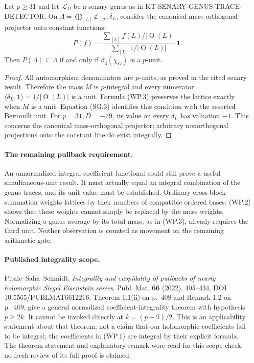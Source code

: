 \begin{lemma}
Let $p\geq31$ and let $\mathcal L_D$ be a senary genus as in
KT-SENARY-GENUS-TRACE-DETECTOR.  On
$\Lambda=\bigoplus_{[L]}\mathbb Z_{(p)}\delta_L$, consider the canonical
mass-orthogonal projector onto constant functions:
\[
 P(f)=\frac{\sum_{[L]}f(L)/|\operatorname O(L)|}
 {\sum_{[L]}1/|\operatorname O(L)|}\,\mathbf1.
 \tag{WP.3}
\]
Then $P(\Lambda)\subseteq\Lambda$ if and only if
$\beta_3(\chi_D)$ is a $p$-unit.
\end{lemma}
\begin{proof}
All automorphism denominators are $p$-units, as proved in the cited
senary result.  Therefore the mass $M$ is $p$-integral and every numerator
$\langle\delta_L,\mathbf1\rangle=1/|\operatorname O(L)|$ is a unit.
Formula (WP.3) preserves the lattice exactly when $M$ is a unit.
Equation (SG.3) identifies this condition with the asserted Bernoulli unit.
For $p=31,D=-79$, its value on every $\delta_L$ has valuation $-1$.
This concerns the canonical mass-orthogonal projector; arbitrary
nonorthogonal projections onto the constant line do exist integrally.
\end{proof}

\paragraph{The remaining pullback requirement.}
An unnormalized integral coefficient functional could still prove a useful
simultaneous-unit result.  It must actually equal an integral combination
of the genus traces, and its unit value must be established.  Ordinary
cross-block summation weights lattices by their numbers of compatible
ordered bases; (WP.2) shows that these weights cannot simply be replaced
by the mass weights.  Normalizing a genus average by its total mass, as in
(WP.3), already requires the third unit.  Neither observation is counted
as movement on the remaining arithmetic gate.

\paragraph{Published integrality scope.}
Pitale--Saha--Schmidt, \emph{Integrality and cuspidality of pullbacks of
nearly holomorphic Siegel Eisenstein series}, Publ. Mat. \textbf{66}
(2022), 405--434, DOI 10.5565/PUBLMAT6612216, Theorem 1.1(ii) on p.~408
and Remark 1.2 on p.~409, give a general normalized coefficient-integrality
theorem with hypothesis $p\geq2k$.  It cannot be invoked directly at
$k=(p+9)/2$.  This is an applicability statement about that theorem,
not a claim that our holomorphic coefficients fail to be integral; the
coefficients in (WP.1) are integral by their explicit formula.  The
theorem statement and explanatory remark were read for this scope check;
no fresh review of its full proof is claimed.
